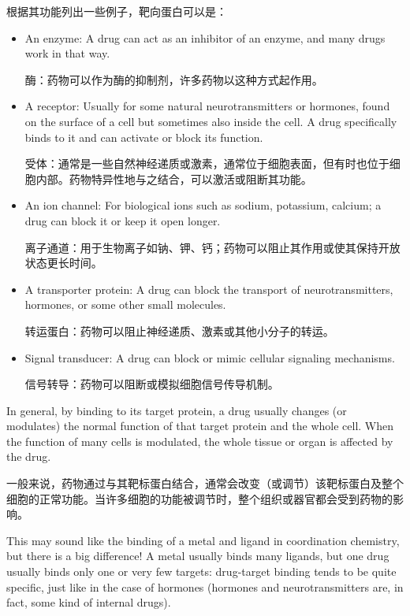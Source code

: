 \documentclass[dvipsnames, svgnames,a4paper,11pt]{article}
\begin{document}
根据其功能列出一些例子，靶向蛋白可以是：
\begin{itemize}

      \item An enzyme: A drug can act as an inhibitor of an enzyme, and many drugs work in that way.

            酶：药物可以作为酶的抑制剂，许多药物以这种方式起作用。

      \item A receptor: Usually for some natural neurotransmitters or hormones, found on the surface of a cell but sometimes also inside the cell. A drug specifically binds to it and can activate or block its function.

            受体：通常是一些自然神经递质或激素，通常位于细胞表面，但有时也位于细胞内部。药物特异性地与之结合，可以激活或阻断其功能。

      \item An ion channel: For biological ions such as sodium, potassium, calcium; a drug can block it or keep it open longer.

            离子通道：用于生物离子如钠、钾、钙；药物可以阻止其作用或使其保持开放状态更长时间。

      \item A transporter protein: A drug can block the transport of neurotransmitters, hormones, or some other small molecules.

            转运蛋白：药物可以阻止神经递质、激素或其他小分子的转运。

      \item Signal transducer: A drug can block or mimic cellular signaling mechanisms.

            信号转导：药物可以阻断或模拟细胞信号传导机制。

\end{itemize}

In general, by binding to its target protein, a drug usually changes (or modulates) the normal function of that target protein and the whole cell. When the function of many cells is modulated, the whole tissue or organ is affected by the drug.

一般来说，药物通过与其靶标蛋白结合，通常会改变（或调节）该靶标蛋白及整个细胞的正常功能。当许多细胞的功能被调节时，整个组织或器官都会受到药物的影响。

This may sound like the binding of a metal and ligand in coordination chemistry, but there is a big difference! A metal usually binds many ligands, but one drug usually binds only one or very few targets: drug-target binding tends to be quite specific, just like in the case of hormones (hormones and neurotransmitters are, in fact, some kind of internal drugs).
\end{document}
